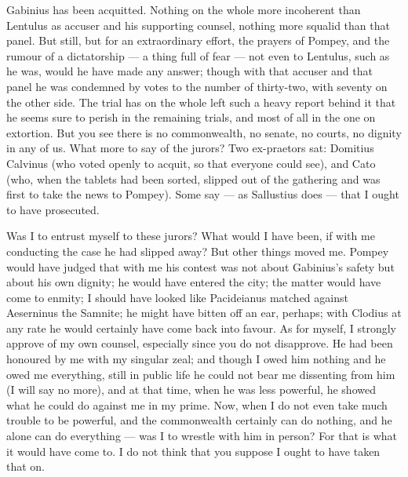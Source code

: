

 Gabinius has been acquitted. Nothing on the whole more incoherent than Lentulus as accuser and his supporting counsel, nothing more squalid than that panel. But still, but for an extraordinary effort, the prayers of Pompey, and the rumour of a dictatorship --- a thing full of fear --- not even to Lentulus, such as he was, would he have made any answer; though with that accuser and that panel he was condemned by votes to the number of thirty-two, with seventy on the other side. The trial has on the whole left such a heavy report behind it that he seems sure to perish in the remaining trials, and most of all in the one on extortion. But you see there is no commonwealth, no senate, no courts, no dignity in any of us. What more to say of the jurors? Two ex-praetors sat: Domitius Calvinus (who voted openly to acquit, so that everyone could see), and Cato (who, when the tablets had been sorted, slipped out of the gathering and was first to take the news to Pompey). Some say --- as Sallustius does --- that I ought to have prosecuted.

 Was I to entrust myself to these jurors? What would I have been, if with me conducting the case he had slipped away? But other things moved me. Pompey would have judged that with me his contest was not about Gabinius's safety but about his own dignity; he would have entered the city; the matter would have come to enmity; I should have looked like Pacideianus matched against Aeserninus the Samnite; he might have bitten off an ear, perhaps; with Clodius at any rate he would certainly have come back into favour. As for myself, I strongly approve of my own counsel, especially since you do not disapprove. He had been honoured by me with my singular zeal; and though I owed him nothing and he owed me everything, still in public life he could not bear me dissenting from him (I will say no more), and at that time, when he was less powerful, he showed what he could do against me in my prime. Now, when I do not even take much trouble to be powerful, and the commonwealth certainly can do nothing, and he alone can do everything --- was I to wrestle with him in person? For that is what it would have come to. I do not think that you suppose I ought to have taken that on.

